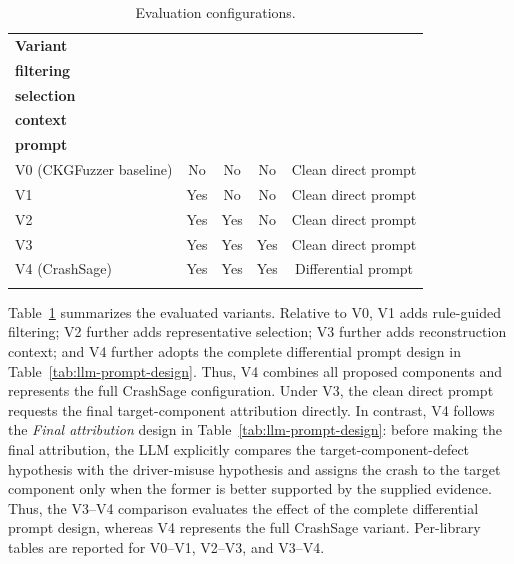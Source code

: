 \documentclass[pdflatex,sn-basic]{sn-jnl}%
\renewcommand{\arraystretch}{1.16}%
\theoremstyle{thmstyleone}%
\theoremstyle{thmstyletwo}%
\theoremstyle{thmstylethree}%
\begin{document}
\begin{table}[ht]
\caption{Evaluation configurations.}
\label{tab:evaluation-configurations}
\centering
\scriptsize
\fontsize{7.8}{8.8}\selectfont
\setlength{\tabcolsep}{1.2pt}
\renewcommand{\arraystretch}{1.12}
\begin{tabular*}{\linewidth}{@{\extracolsep{\fill}}lcccc}
\toprule
\textbf{Variant} & \makecell{\textbf{Rule-guided}\\\textbf{filtering}} & \makecell{\textbf{Representative}\\\textbf{selection}} & \makecell{\textbf{Reconstruction}\\\textbf{context}} & \makecell{\textbf{Final}\\\textbf{prompt}} \\
\midrule
V0 (CKGFuzzer baseline) & No & No & No & Clean direct prompt \\
V1 & Yes & No & No & Clean direct prompt \\
V2 & Yes & Yes & No & Clean direct prompt \\
V3 & Yes & Yes & Yes & Clean direct prompt \\
V4 (CrashSage) & Yes & Yes & Yes & Differential prompt \\
\botrule
\end{tabular*}
\end{table}

\FloatBarrier
Table~\ref{tab:evaluation-configurations} summarizes the evaluated variants. Relative to V0, V1 adds rule-guided filtering; V2 further adds representative selection; V3 further adds reconstruction context; and V4 further adopts the complete differential prompt design in Table~\ref{tab:llm-prompt-design}. Thus, V4 combines all proposed components and represents the full CrashSage configuration. Under V3, the clean direct prompt requests the final target-component attribution directly. In contrast, V4 follows the \emph{Final attribution} design in Table~\ref{tab:llm-prompt-design}: before making the final attribution, the LLM explicitly compares the target-component-defect hypothesis with the driver-misuse hypothesis and assigns the crash to the target component only when the former is better supported by the supplied evidence. Thus, the V3--V4 comparison evaluates the effect of the complete differential prompt design, whereas V4 represents the full CrashSage variant. Per-library tables are reported for V0--V1, V2--V3, and V3--V4.
\end{document}
